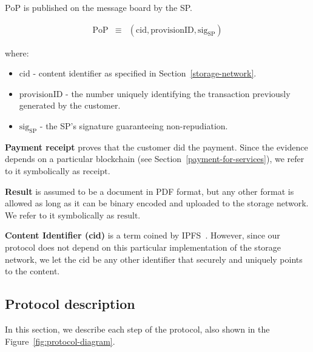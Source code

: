 $\mathrm{PoP}$ is published on the message board by the SP.


\begin{eqnarray}
\mathrm{PoP} & \equiv & (\mathrm{cid}, \mathrm{provisionID}, \mathrm{sig}_\mathrm{SP})
\end{eqnarray}

where:

\begin{itemize}

\item $\mathrm{cid}$ - content identifier as specified in Section~\ref{storage-network}.
\item $\mathrm{provisionID}$ - the number uniquely identifying the transaction previously generated by the customer.
\item $\mathrm{sig}_\mathrm{SP}$ - the SP's signature guaranteeing non-repudiation.
\end{itemize}

\noindent \textbf
{Payment receipt}\label{payment-receipt} proves that the customer did the payment. Since the evidence depends on a particular blockchain (see Section~\ref{payment-for-services}), we refer to it symbolically as
$\mathrm{receipt}$.

\noindent \textbf
{Result}\label{results} is assumed to be a document in PDF format, but any other format is allowed as long as it can be binary encoded and uploaded to the storage network. We refer to it symbolically as $\mathrm{result}$.

\noindent \textbf
{Content Identifier (cid)}\label{content-identifier-cid} is a term coined by IPFS~\cite{ipfsContentIdentifiersCIDs}. However, since our protocol does not depend on this particular implementation of the storage network, we let the $\mathrm{cid}$ be any other identifier that securely and uniquely points to the content.

\subsection{Protocol description}\label{protocol-description}

In this section, we describe each step of the protocol, also shown in the Figure~\ref{fig:protocol-diagram}.

